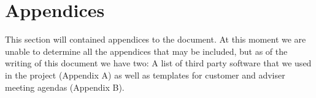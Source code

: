 \documentclass[../document.tex]{subfiles}
\begin{document}
\section{Appendices}


This section will contained appendices to the document. At this moment we are unable to determine all the appendices that may be included, but as of the writing of this document we have two: A list of third party software that we used in the project (Appendix A) as well as templates for customer and adviser meeting agendas (Appendix B).
\end{document}
